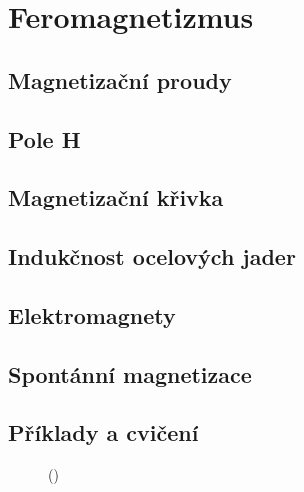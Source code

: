 \setchaptertoc
\chapter{Feromagnetizmus}\label{fyz:IIchapXXXVI}

  \section{Magnetizační proudy}\label{fyz:IIchapXXXVIsecI}
  \section{Pole H}\label{fyz:IIchapXXXVIsecII}
  \section{Magnetizační křivka}\label{fyz:IIchapXXXVIsecIII}
  \section{Indukčnost ocelových jader}\label{fyz:IIchapXXXVIsecIV}
  \section{Elektromagnety}\label{fyz:IIchapXXXVIsecV}
  \section{Spontánní magnetizace}\label{fyz:IIchapXXXVIsecVI}
  \section{Příklady a cvičení}\label{fyz:IIchapXXXVIsecVII}

    \begin{figure}[ht!] %
      \centering
                     \newline
                     \newline
      \caption{
               (\cite[s.~748]{Feynman02})}
      \label{fyz:fig831}
    \end{figure}

